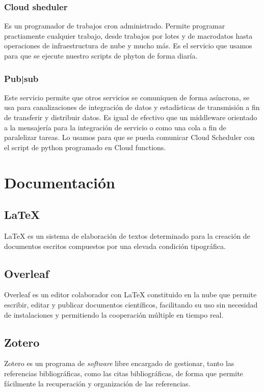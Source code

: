 \subsubsection{Cloud sheduler} \cite{cloud_scheduler} Es un programador de trabajos cron administrado. Permite programar practiamente cualquier trabajo, desde trabajos por lotes y de macrodatos hasta operaciones de infraestructura de nube y mucho más. Es el servicio que usamos para que se ejecute nuestro scripts de phyton de forma diaría.
    	
\subsubsection{Pub|sub} \cite{pub/sub} Este servicio permite que otros servicios se comuniquen de forma asíncrona, se usa para canalizaciones de integración de datos y estadísticas de transmisión a fin de transferir y distribuir datos. Es igual de efectivo que un middleware orientado a la mensajería para la integración de servicio o como una cola a fin de paralelizar tareas. Lo usamos para que se pueda comunicar Cloud Scheduler con el script de python programado en Cloud functions.

\section{Documentación}
\subsection{LaTeX}
LaTeX \cite{Latex} es un sistema de elaboración de textos determinado para la creación de documentos escritos compuestos por una elevada condición tipográfica.

\subsection{Overleaf}
Overleaf \cite{Overleaf} es un editor colaborador con LaTeX constituido en la nube que permite escribir, editar y publicar documentos científicos, facilitando su uso sin necesidad de instalaciones y permitiendo la cooperación múltiple en tiempo real.

\subsection{Zotero}
Zotero \cite{Zotero} es un programa de \emph{software} libre encargado de gestionar, tanto las referencias bibliográficas, como las citas bibliográficas, de forma que permite fácilmente la recuperación y organización de las referencias.